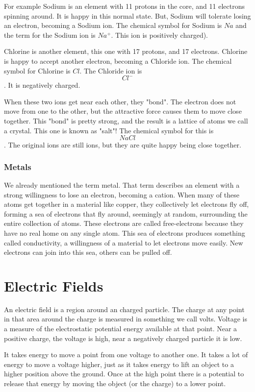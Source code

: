 For example Sodium is an element with 11 protons in the core, and 11
electrons spinning around. It is happy in this normal state. But, Sodium
will tolerate losing an electron, becoming a Sodium ion. The chemical symbol
for Sodium is $Na$ and the term for the Sodium ion is $Na^{+}$. This
ion is positively charged).

Chlorine is another element, this one with 17 protons, and 17
electrons. Chlorine is happy to accept another electron, becoming a
Chloride ion. The chemical symbol for Chlorine is $Cl$. The Chloride ion is
$$Cl^{-}$$. It is negatively charged.

When these two ions get near each other, they "bond". The electron does not
move from one to the other, but the attractive force causes them to move close
together.  This "bond" is pretty strong, and the result is a lattice of atoms we
call a crystal. This one is known as "salt"! The chemical symbol for this
is $$NaCl$$. The original ions are still ions, but they are quite happy being
close together.

\subsubsection{Metals}

We already mentioned the term metal. That term describes an element with a
strong willingness to lose an electron, becoming a cation. When many of
these atoms get together in a material like copper, they collectively let
electrons fly off, forming a sea of electrons that fly around, seemingly at
random, surrounding the entire collection of atoms. These electrons are called
free-electrons because they have no real home on any single atom. This sea
of electrons produces something called conductivity, a willingness of a
material to let electrons move easily. New electrons can join into this
sea, others can be pulled off.

\section{Electric Fields}

An electric field is a region around an charged particle. The charge at any
point in that area around the charge is measured in something we call
volts. Voltage is a measure of the electrostatic potential energy
available at that point. Near a positive charge, the voltage is high, near a
negatively charged particle it is low. 

It takes energy to move a point from one voltage to another one. It takes a lot
of energy to move a voltage higher, just as it takes energy to lift an object
to a higher position above the ground. Once at the high point there is a
potential to release that energy by moving the object (or the charge) to a
lower point. 

